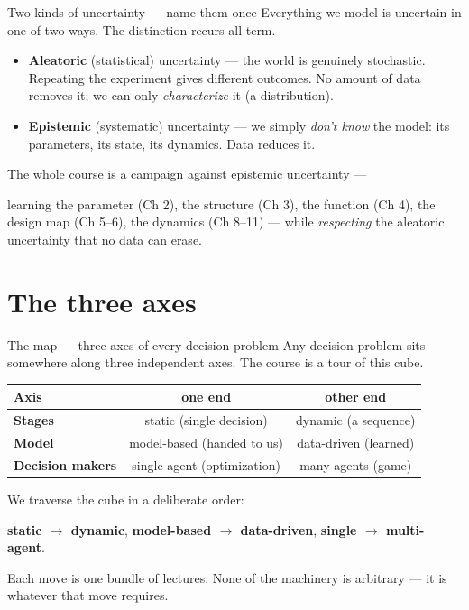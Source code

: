 \documentclass[10pt, aspectratio=169]{beamer}
\begin{document}
\begin{frame}{Two kinds of uncertainty --- name them once}
Everything we model is uncertain in one of two ways. The distinction recurs all term.
\medskip
\begin{itemize}\setlength\itemsep{4pt}
\item \textbf{Aleatoric} (statistical) uncertainty --- the world is genuinely stochastic. Repeating the experiment gives different outcomes. No amount of data removes it; we can only \emph{characterize} it (a distribution).
\item \textbf{Epistemic} (systematic) uncertainty --- we simply \emph{don't know} the model: its parameters, its state, its dynamics. Data \alert{reduces} it.
\end{itemize}
\medskip

\pause
\begin{center}\large
The whole course is a campaign against \alert{epistemic} uncertainty ---
\end{center}
learning the parameter (Ch 2), the structure (Ch 3), the function (Ch 4), the design map (Ch 5--6), the dynamics (Ch 8--11) --- while \emph{respecting} the aleatoric uncertainty that no data can erase.
\end{frame}

\section{The three axes}

\begin{frame}{The map --- three axes of every decision problem}
Any decision problem sits somewhere along three independent axes. The course is a tour of this cube.
\medskip
\begin{center}\footnotesize\renewcommand{\arraystretch}{1.4}
\begin{tabular}{l|c|c}
\textbf{Axis} & \textbf{one end} & \textbf{other end} \\
\hline
\textbf{Stages} & static (single decision) & dynamic (a sequence) \\
\textbf{Model} & model-based (handed to us) & data-driven (learned) \\
\textbf{Decision makers} & single agent (optimization) & many agents (game) \\
\end{tabular}
\end{center}
\medskip

\pause
We traverse the cube in a deliberate order:
\begin{center}\large
\textbf{static $\to$ dynamic}, \quad \textbf{model-based $\to$ data-driven}, \quad \textbf{single $\to$ multi-agent}.
\end{center}
\medskip
\pause
Each move is one bundle of lectures. None of the machinery is arbitrary --- it is whatever that move requires.
\end{frame}
\end{document}
